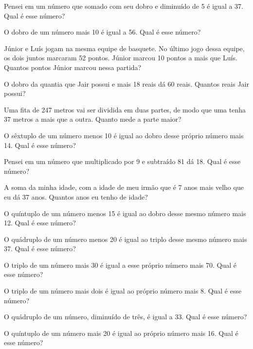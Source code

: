 \item Pensei em um número que somado com seu dobro e diminuído de 5 é igual a 37. Qual é esse número?

\item O dobro de um número mais 10 é igual a 56. Qual é esse número?

\item Júnior e Luís jogam na mesma equipe de basquete. No último jogo dessa equipe, os dois juntos marcaram 52 pontos. Júnior marcou 10 pontos a mais que Luís. Quantos pontos Júnior marcou nessa partida?

\item O dobro da quantia que Jair possui e mais 18 reais dá 60 reais. Quantos reais Jair possui?

\item Uma fita de 247 metros vai ser dividida em duas partes, de modo que uma tenha 37 metros a mais que a outra. Quanto mede a parte maior?

\item O sêxtuplo de um número menos 10 é igual ao dobro desse próprio número mais 14. Qual é esse número?

\item Pensei em um número que multiplicado por 9 e subtraído 81 dá 18. Qual é esse número?

\item A soma da minha idade, com a idade de meu irmão que é 7 anos mais velho que eu dá 37 anos. Quantos anos eu tenho de idade?

\item O quíntuplo de um número menos 15 é igual ao dobro desse mesmo número mais 12. Qual é esse número?

\item O quádruplo de um número menos 20 é igual ao triplo desse mesmo número mais 37. Qual é esse número?

\item O triplo de um número mais 30 é igual a esse próprio número mais 70. Qual é esse número?

\item O triplo de um número mais dois é igual ao próprio número mais 8. Qual é esse número?

\item O quádruplo de um número, diminuído de três, é igual a 33. Qual é esse número?

\item O quíntuplo de um número mais 20 é igual ao próprio número mais 16. Qual é esse número?

